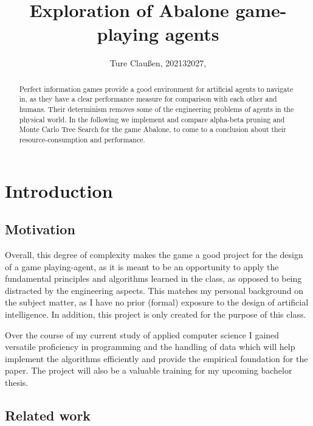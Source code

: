 \documentclass{../lib/llncs}
\begin{document}
\title{Exploration of Abalone game-playing agents}
\author{Ture Claußen, 202132027, }

{\def\addcontentsline#1#2#3{}\maketitle} %

\begin{abstract}
	Perfect information games provide a good environment for artificial agents to navigate in, as they have a clear performance measure for comparison with each other and humans. Their determinism removes some of the engineering problems of agents in the physical world. In the following we implement and compare alpha-beta pruning and Monte Carlo Tree Search for the game Abalone, to come to a conclusion about their resource-consumption and performance.
\end{abstract}

\section{Introduction}

\subsection{Motivation}
Overall, this degree of complexity makes the game a good project for the design of a game playing-agent, as it is meant to be an opportunity to apply the fundamental principles and algorithms learned in the class, as opposed to being distracted by the engineering aspects. This matches my personal background on the subject matter, as I have no prior (formal) exposure to the design of artificial intelligence. In addition, this project is only created for the purpose of this class.

Over the course of my current study of applied computer science I gained versatile proficiency in programming and the handling of data which will help implement the algorithms efficiently and provide the empirical foundation for the paper. The project will also be a valuable training for my upcoming bachelor thesis.

\subsection{Related work}
\end{document}
